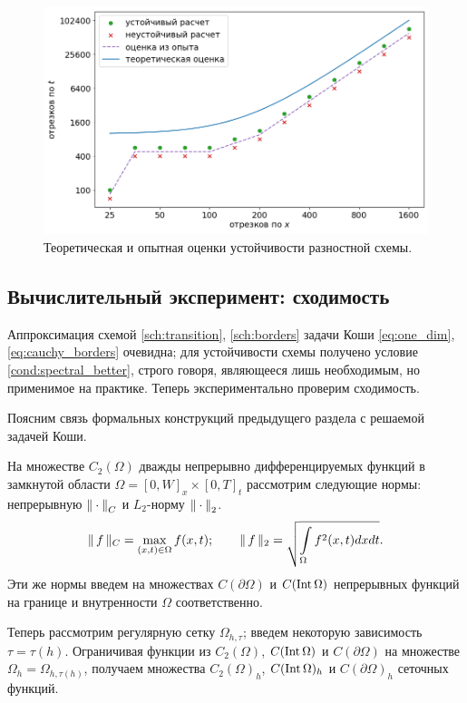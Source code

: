 \begin{figure}[!tp]
    \centering
    \includegraphics[width=\textwidth]{figures/stability_bounds.png}
    \vspace{-0.7cm}
    \caption{Теоретическая и опытная оценки устойчивости разностной схемы.}
    \label{fig:stability_bounds}
\end{figure}


\subsection{Вычислительный эксперимент: сходимость}

Аппроксимация схемой \eqref{sch:transition}, \eqref{sch:borders} задачи Коши \eqref{eq:one_dim}, \eqref{eq:cauchy_borders} очевидна; для устойчивости схемы получено условие \eqref{cond:spectral_better}, строго говоря, являющееся лишь необходимым, но применимое на практике. Теперь экспериментально проверим сходимость.

Поясним связь формальных конструкций предыдущего раздела с решаемой задачей Коши.

На множестве $C_2(\Omega)$ дважды непрерывно дифференцируемых функций в замкнутой области $\Omega = [0, W]_x \times [0, T]_t$ рассмотрим следующие нормы: непрерывную ${\| \cdot \|}_C$ и $L_2$-норму ${\| \cdot \|}_2$.
$$\| \, f \, \|_C = \max \limits_{(x, t) \in \Omega} f(x, t); \qquad \| \, f \, \|_2 = \sqrt{\int \limits_{\Omega} f^2(x, t) dx dt} {\text{.}}$$
Эти же нормы введем на множествах $C(\partial \Omega)$ и $C(\operatorname{{Int}} \Omega)$ непрерывных функций на границе и внутренности $\Omega$ соответственно.

Теперь рассмотрим регулярную сетку $\Omega_{h, \tau}$; введем некоторую зависимость $\tau = \tau(h)$. Ограничивая функции из $C_2(\Omega)$, $C(\operatorname{{Int}} \Omega)$ и $C(\partial \Omega)$ на множестве $\Omega_h = \Omega_{h, \tau(h)}$, получаем множества $C_2(\Omega)_h$, $C(\operatorname{{Int}} \Omega)_h$ и $C(\partial \Omega)_h$ сеточных функций.

